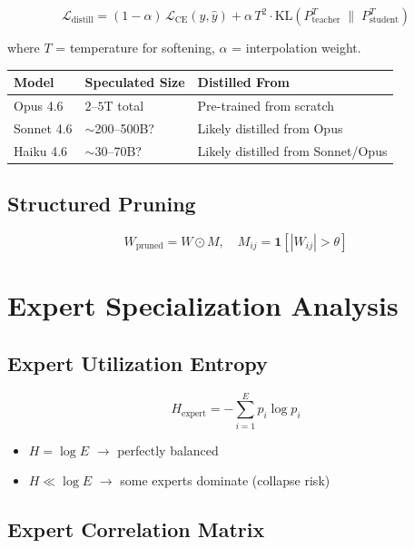 \documentclass[11pt,a4paper]{article}
\begin{document}
$$\mathcal{L}_{\text{distill}} = (1 - \alpha)\,\mathcal{L}_{\text{CE}}(y, \hat{y}) + \alpha\, T^2 \cdot \text{KL}\!\left(P_{\text{teacher}}^T \;\|\; P_{\text{student}}^T\right)$$

where $T$ = temperature for softening, $\alpha$ = interpolation weight.

\begin{center}
\begin{tabular}{lll}
\toprule
\textbf{Model} & \textbf{Speculated Size} & \textbf{Distilled From} \\
\midrule
Opus 4.6 & $2\text{--}5$T total & Pre-trained from scratch \\
Sonnet 4.6 & $\sim$200--500B? & Likely distilled from Opus \\
Haiku 4.6 & $\sim$30--70B? & Likely distilled from Sonnet/Opus \\
\bottomrule
\end{tabular}
\end{center}

\subsection{Structured Pruning}

$$W_{\text{pruned}} = W \odot M, \quad M_{ij} = \mathbf{1}[|W_{ij}| > \theta]$$

\section{Expert Specialization Analysis}

\subsection{Expert Utilization Entropy}

$$H_{\text{expert}} = -\sum_{i=1}^{E} p_i \log p_i$$

\begin{itemize}
  \item $H = \log E$ $\to$ perfectly balanced
  \item $H \ll \log E$ $\to$ some experts dominate (collapse risk)
\end{itemize}

\subsection{Expert Correlation Matrix}
\end{document}
